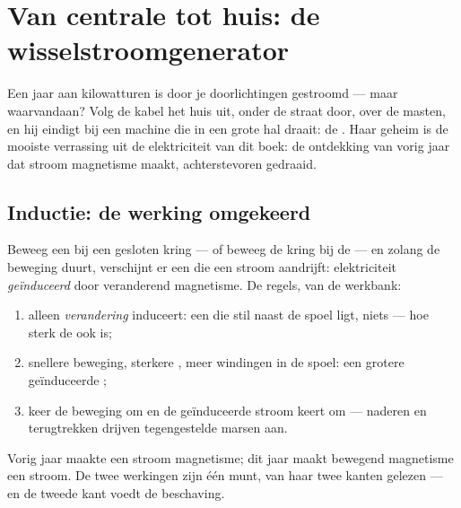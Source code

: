 \chapter{Van centrale tot huis: de wisselstroomgenerator}\label{ch:g9:alternator}

Een jaar aan kilowatturen is door je doorlichtingen gestroomd ---
maar waarvandaan? Volg de kabel het huis uit, onder de straat door, over
de masten, en hij eindigt bij een machine die in een grote hal draait:
de . Haar geheim is de mooiste verrassing uit
de elektriciteit van dit boek: de ontdekking van vorig jaar dat stroom
magnetisme maakt, achterstevoren gedraaid.

\section{Inductie: de werking omgekeerd}

\begin{proposition}\label{prop:g9:alternator:induction}
Beweeg een  bij een gesloten kring --- of beweeg de
kring bij de  --- en zolang de beweging duurt,
verschijnt er een  die een stroom aandrijft:
elektriciteit \emph{geïnduceerd} door veranderend magnetisme. De
regels, van de werkbank:
\begin{enumerate}
  \item alleen \emph{verandering} induceert: een  die
        stil naast de spoel ligt, niets --- hoe sterk de
         ook is;
  \item snellere beweging, sterkere , meer windingen in
        de spoel: een grotere geïnduceerde ;
  \item keer de beweging om en de geïnduceerde stroom keert om ---
        naderen en terugtrekken drijven tegengestelde marsen aan.
\end{enumerate}
Vorig jaar maakte een stroom magnetisme; dit jaar maakt bewegend
magnetisme een stroom. De twee werkingen zijn één munt, van haar twee
kanten gelezen --- en de tweede kant voedt de beschaving.
\end{proposition}

